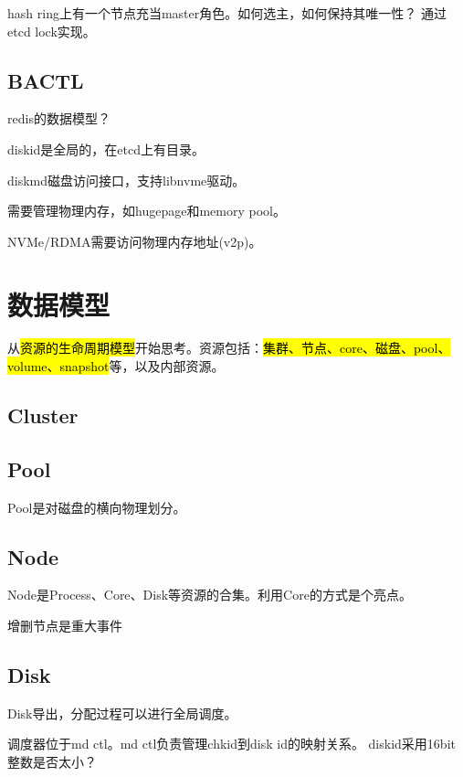 hash ring上有一个节点充当master角色。如何选主，如何保持其唯一性？
通过etcd lock实现。

\subsection{BACTL}


redis的数据模型？

diskid是全局的，在etcd上有目录。

diskmd磁盘访问接口，支持libnvme驱动。

需要管理物理内存，如hugepage和memory pool。

NVMe/RDMA需要访问物理内存地址(v2p)。

\section{数据模型}


从\hl{资源的生命周期模型}开始思考。资源包括：\hl{集群、节点、core、磁盘、pool、volume、snapshot}等，以及内部资源。

\subsection{Cluster}

\subsection{Pool}

Pool是对磁盘的横向物理划分。

\subsection{Node}

Node是Process、Core、Disk等资源的合集。利用Core的方式是个亮点。

增删节点是重大事件

\subsection{Disk}

Disk导出，分配过程可以进行全局调度。

调度器位于md ctl。md ctl负责管理chkid到disk id的映射关系。
diskid采用16bit整数是否太小？

